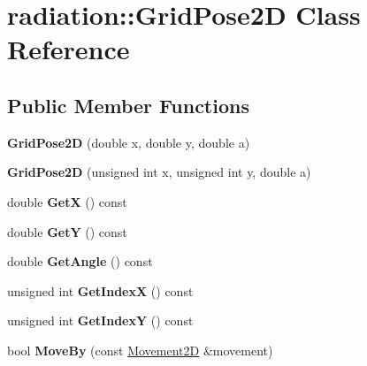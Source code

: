 \hypertarget{classradiation_1_1_grid_pose2_d}{}\section{radiation\+:\+:Grid\+Pose2D Class Reference}
\label{classradiation_1_1_grid_pose2_d}
\subsection*{Public Member Functions}
\begin{DoxyCompactItemize}
\item 
\hypertarget{classradiation_1_1_grid_pose2_d_ab8aa63a7082bcca0819ab690459e2ae1}{}\label{classradiation_1_1_grid_pose2_d_ab8aa63a7082bcca0819ab690459e2ae1} 
{\bfseries Grid\+Pose2D} (double x, double y, double a)
\item 
\hypertarget{classradiation_1_1_grid_pose2_d_ac242b1fe6d3c1123f326b4f1aca94f97}{}\label{classradiation_1_1_grid_pose2_d_ac242b1fe6d3c1123f326b4f1aca94f97} 
{\bfseries Grid\+Pose2D} (unsigned int x, unsigned int y, double a)
\item 
\hypertarget{classradiation_1_1_grid_pose2_d_a12767b71b7ff19c2aa393811eafd9cfd}{}\label{classradiation_1_1_grid_pose2_d_a12767b71b7ff19c2aa393811eafd9cfd} 
double {\bfseries GetX} () const
\item 
\hypertarget{classradiation_1_1_grid_pose2_d_ac85c908d20c078a0971c0bd0d3eeea32}{}\label{classradiation_1_1_grid_pose2_d_ac85c908d20c078a0971c0bd0d3eeea32} 
double {\bfseries GetY} () const
\item 
\hypertarget{classradiation_1_1_grid_pose2_d_af236d050c3bda424c52502eab54de3db}{}\label{classradiation_1_1_grid_pose2_d_af236d050c3bda424c52502eab54de3db} 
double {\bfseries Get\+Angle} () const
\item 
\hypertarget{classradiation_1_1_grid_pose2_d_adbbf48bd8da01de68d667b69d173c1e9}{}\label{classradiation_1_1_grid_pose2_d_adbbf48bd8da01de68d667b69d173c1e9} 
unsigned int {\bfseries Get\+IndexX} () const
\item 
\hypertarget{classradiation_1_1_grid_pose2_d_ad3b41be3e4bde96352befa31c23064aa}{}\label{classradiation_1_1_grid_pose2_d_ad3b41be3e4bde96352befa31c23064aa} 
unsigned int {\bfseries Get\+IndexY} () const
\item 
\hypertarget{classradiation_1_1_grid_pose2_d_a80e54a4a5863984b378522784cc3ba95}{}\label{classradiation_1_1_grid_pose2_d_a80e54a4a5863984b378522784cc3ba95} 
bool {\bfseries Move\+By} (const \hyperlink{classradiation_1_1_movement2_d}{Movement2D} \&movement)
\end{DoxyCompactItemize}

